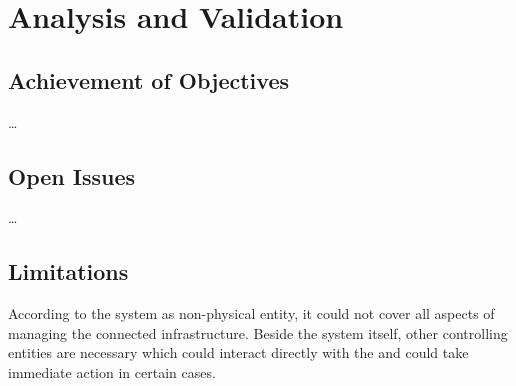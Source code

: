 
\chapter{Analysis and Validation}
\label{ch:Analysis and Validation}

\section{Achievement of Objectives}
\label{ch:Analysis and Validation:sec:Achievement of Objectives}

\dots

\section{Open Issues}
\label{ch:Analysis and Validation:sec:Open Issues}

\dots

\section{Limitations}
\label{ch:Analysis and Validation:sec:Limitations}

According to the system as non-physical entity, it could not cover all aspects of managing the connected infrastructure. Beside the system itself, other controlling entities are necessary which could interact directly with the  and could take immediate action in certain cases.
